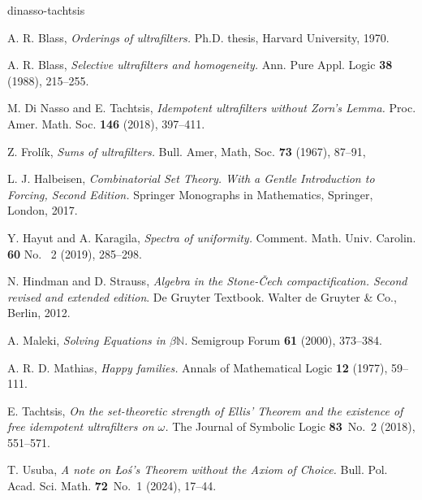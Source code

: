 \documentclass[10pt]{amsart}
\theoremstyle{definition}
\theoremstyle{remark}
\begin{document}
\begin{thebibliography}{dinasso-tachtsis}


A. R. Blass,
{\em Orderings of ultrafilters.}
Ph.D. thesis, Harvard University, 1970.

A. R. Blass,
{\em Selective ultrafilters and homogeneity.}
Ann. Pure Appl. Logic
{\bf 38} (1988), 215--255.

M. Di Nasso and E. Tachtsis, 
{\em Idempotent ultrafilters without Zorn's Lemma.}
Proc. Amer. Math. Soc.
{\bf 146} (2018), 397--411.

Z. Frol{\'i}k,
{\em Sums of ultrafilters.}
Bull. Amer, Math, Soc.
{\bf 73} (1967), 87--91,

L. J. Halbeisen,
{\em Combinatorial Set Theory. With a Gentle Introduction to Forcing, Second Edition.}
Springer Monographs in Mathematics, Springer, London, 2017.

Y. Hayut and  A. Karagila,
{\em Spectra of uniformity.}
Comment. Math. Univ. Carolin.
{\bf 60} No.~ 2 (2019), 285--298.

N. Hindman and D. Strauss,
{\em Algebra in the {S}tone-\v {C}ech compactification. Second revised and extended edition}.
De Gruyter Textbook. Walter de Gruyter \& Co., Berlin, 2012.

A. Maleki,
{\em Solving Equations in $\beta\mathbb N$.}
Semigroup Forum
{\bf 61} (2000), 373--384.

A. R. D. Mathias,
{\em Happy families.}
Annals of Mathematical Logic
{\bf 12} (1977), 59--111.

E. Tachtsis,
{\em On the set-theoretic strength of Ellis' Theorem and the existence of free idempotent ultrafilters on $\omega$.}
The Journal of Symbolic Logic
{\bf 83}~No.~2 (2018), 551--571.

T. Usuba,
{\em A note on \L o\'s's Theorem without the Axiom of Choice.}
Bull. Pol. Acad. Sci. Math.
{\bf 72}~No.~1 (2024), 17--44.

\end{thebibliography}
\end{document}

